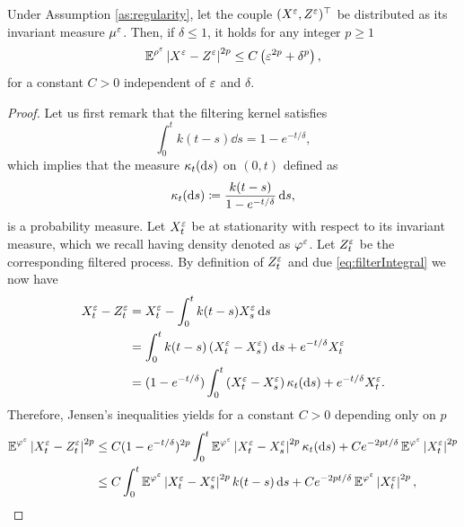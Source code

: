 \documentclass[10pt]{article}
\begin{document}
\begin{appendices}
\begin{lemma}\label{lem:distanceZandX} Under Assumption \ref{as:regularity}, let the couple $(X^\varepsilon, Z^\varepsilon)^\top$ be distributed as its invariant measure $\mu^\varepsilon$. Then, if $\delta \leq 1$, it holds for any integer $p \geq 1$
	\begin{equation}
	\operatorname{\mathbb{E}}^{\rho^\varepsilon} \left\lvert X^\varepsilon - Z^\varepsilon\right\rvert^{2p} \leq C\left(\varepsilon^{2p} + \delta^p\right),
	\end{equation}
	for a constant $C > 0$ independent of $\varepsilon$ and $\delta$.
\end{lemma}
\begin{proof} Let us first remark that the filtering kernel satisfies
	\begin{equation}\label{eq:filterIntegral}
	\int_0^t k(t-s) \dd s = 1 - e^{-t/\delta},
	\end{equation}
	which implies that the measure $\kappa_t(\mathrm{d} s)$ on $(0, t)$ defined as
	\begin{equation}
	\kappa_t(\mathrm{d} s) \coloneqq \frac{k(t-s)}{1 - e^{-t/\delta}} \,\mathrm{d} s,
	\end{equation}
	is a probability measure. Let $X_t^\varepsilon$ be at stationarity with respect to its invariant measure, which we recall having density denoted as $\varphi^\varepsilon$. Let $Z_t^\varepsilon$ be the corresponding filtered process. By definition of $Z^\varepsilon_t$ and due \eqref{eq:filterIntegral} we now have
	\begin{equation}
	\begin{aligned}
	X_t^\varepsilon - Z_t^\varepsilon &= X_t^\varepsilon - \int_0^t k(t-s) X_s^\varepsilon \,\mathrm{d} s\\
	&= \int_0^t k(t - s) \left(X_t^\varepsilon - X_s^\varepsilon\right) \,\mathrm{d} s + e^{-t/\delta} X^\varepsilon_t\\
	&= (1 - e^{-t/\delta})\int_0^t \left(X_t^\varepsilon - X_s^\varepsilon\right) \kappa_t(\mathrm{d} s) + e^{-t/\delta} X^\varepsilon_t.
	\end{aligned}
	\end{equation}
	Therefore, Jensen's inequalities yields for a constant $C > 0$ depending only on $p$
	\begin{equation}
	\begin{aligned}
	\E^{\phi^\epl}\abs{X_t^\epl - Z_t^\epl}^{2p} &\leq C (1 - e^{-t/\delta})^{2p} \int_0^t \E^{\phi^\epl} \abs{X_t^\epl - X_s^\epl}^{2p} \kappa_t (\d s) + C e^{-2pt/\delta} \E^{\phi^\epl} \abs{X^\epl_t}^{2p}\\
	&\leq C\int_0^t \E^{\phi^\epl} \abs{X_t^\epl - X_s^\epl}^{2p} k(t-s) \dd s + Ce^{-2pt/\delta} \E^{\phi^\epl} \abs{X^\epl_t}^{2p},
	\end{aligned}

\end{equation}
\end{proof}
\end{appendices}
\end{document}
